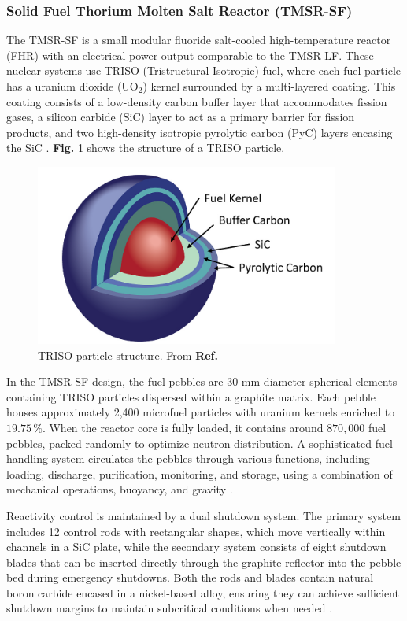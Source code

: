 \subsubsection{Solid Fuel Thorium Molten Salt Reactor (TMSR-SF)}

The TMSR-SF is a small modular fluoride salt-cooled high-temperature reactor (FHR) with an electrical power output comparable to the TMSR-LF. These nuclear systems use TRISO (Tristructural-Isotropic) fuel, where each fuel particle has a uranium dioxide (\(\text{UO}_2\)) kernel surrounded by a multi-layered coating. This coating consists of a low-density carbon buffer layer that accommodates fission gases, a silicon carbide (SiC) layer to act as a primary barrier for fission products, and two high-density isotropic pyrolytic carbon (PyC) layers encasing the SiC \cite{TRISO, IAEA_TRISO_REPORT}. \textbf{Fig.} \ref{fig:TRISO} shows the structure of a TRISO particle.

\begin{figure}[ht]
    \centering
    \includegraphics[scale=0.5]{Kap6/Figures_Kap6/TRISO_particle.png}
    \caption{TRISO particle structure. From \textbf{Ref.} \cite{IAEA_TRISO_REPORT}}
    \label{fig:TRISO}
\end{figure}

In the TMSR-SF design, the fuel pebbles are 30-mm diameter spherical elements containing TRISO particles dispersed within a graphite matrix. Each pebble houses approximately 2,400 microfuel particles with uranium kernels enriched to \(19.75 \, \%\). When the reactor core is fully loaded, it contains around \(870,000\) fuel pebbles, packed randomly to optimize neutron distribution. A sophisticated fuel handling system circulates the pebbles through various functions, including loading, discharge, purification, monitoring, and storage, using a combination of mechanical operations, buoyancy, and gravity \cite{TMSR_book}.

Reactivity control is maintained by a dual shutdown system. The primary system includes 12 control rods with rectangular shapes, which move vertically within channels in a SiC plate, while the secondary system consists of eight shutdown blades that can be inserted directly through the graphite reflector into the pebble bed during emergency shutdowns. Both the rods and blades contain natural boron carbide encased in a nickel-based alloy, ensuring they can achieve sufficient shutdown margins to maintain subcritical conditions when needed \cite{TMSR_book}.


